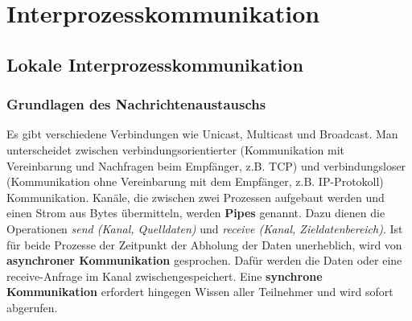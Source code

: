 \documentclass{article}
\begin{document}
\newpage
\section{Interprozesskommunikation}
\subsection{Lokale Interprozesskommunikation}
\subsubsection{Grundlagen des Nachrichtenaustauschs}
    Es gibt verschiedene Verbindungen wie Unicast, Multicast und Broadcast. Man unterscheidet zwischen verbindungsorientierter (Kommunikation mit Vereinbarung und Nachfragen beim Empfänger, z.B. TCP) und verbindungsloser (Kommunikation ohne Vereinbarung mit dem Empfänger, z.B. IP-Protokoll) Kommunikation.\newline
    Kanäle, die zwischen zwei Prozessen aufgebaut werden und einen Strom aus Bytes übermitteln, werden \textbf{Pipes} genannt. Dazu dienen die Operationen \textit{send (Kanal, Quelldaten)} und \textit{receive (Kanal, Zieldatenbereich)}.\newline
    Ist für beide Prozesse der Zeitpunkt der Abholung der Daten unerheblich, wird von \textbf{asynchroner Kommunikation} gesprochen. Dafür werden die Daten oder eine receive-Anfrage im Kanal zwischengespeichert.\newline
    Eine \textbf{synchrone Kommunikation} erfordert hingegen Wissen aller Teilnehmer und wird sofort abgerufen. 
\end{document}
